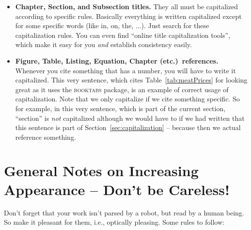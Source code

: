 \begin{itemize}
  \item \textbf{Chapter, Section, and Subsection titles.} They all must be capitalized according to specific rules. Basically everything is written capitalized except for some specific words (like in, on, the, $\dots$). Just search for these capitalization rules. You can even find ``online title capitalization tools'', which make it easy for you \emph{and} establish consistency easily.
  \item \textbf{Figure, Table, Listing, Equation, Chapter (etc.)\ references.} Whenever you cite something that has a number, you will have to write it capitalized. This very sentence, which cites Table~\ref{tab:meatPrices} for looking great as it uses the \textsc{booktabs} package, is an example of correct usage of capitalization. Note that we only capitalize if we cite something specific. So for example, in this very sentence, which is part of the current section, ``section'' is \emph{not} capitalized although we would have to if we had written that this sentence is part of Section~\ref{sec:capitalization} -- because then we actual reference something.
\end{itemize}


\section[General Notes on Increasing Appearance -- Don't be Careless!]{General Notes on Increasing Appearance{\ifLongThesisStyle\newline\fi} -- Don't be Careless!}

Don't forget that your work isn't parsed by a robot, but read by a human being. So make it pleasant for them, i.e., optically pleasing. Some rules to follow:

